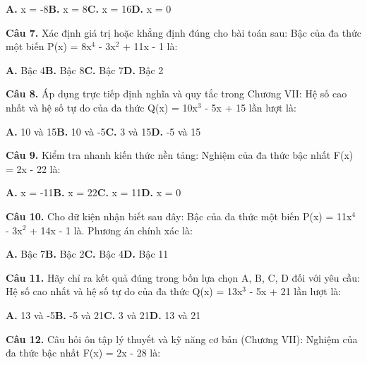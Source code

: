 \documentclass[11pt,a4paper]{article}
\begin{document}
\hspace*{1.5em}\textbf{A.} x = -8\quad\quad \textbf{B.} x = 8\quad\quad \textbf{C.} x = 16\quad\quad \textbf{D.} x = 0\par\vspace{2pt}
\textbf{\color{primary} Câu 7.} Xác định giá trị hoặc khẳng định đúng cho bài toán sau: Bậc của đa thức một biến P(x) = 8x$^4$ - 3x$^2$ + 11x - 1 là:\par
\hspace*{1.5em}\textbf{A.} Bậc 4\quad\quad \textbf{B.} Bậc 8\quad\quad \textbf{C.} Bậc 7\quad\quad \textbf{D.} Bậc 2\par\vspace{2pt}
\textbf{\color{primary} Câu 8.} Áp dụng trực tiếp định nghĩa và quy tắc trong Chương VII: Hệ số cao nhất và hệ số tự do của đa thức Q(x) = 10x$^3$ - 5x + 15 lần lượt là:\par
\hspace*{1.5em}\textbf{A.} 10 và 15\quad\quad \textbf{B.} 10 và -5\quad\quad \textbf{C.} 3 và 15\quad\quad \textbf{D.} -5 và 15\par\vspace{2pt}
\textbf{\color{primary} Câu 9.} Kiểm tra nhanh kiến thức nền tảng: Nghiệm của đa thức bậc nhất F(x) = 2x - 22 là:\par
\hspace*{1.5em}\textbf{A.} x = -11\quad\quad \textbf{B.} x = 22\quad\quad \textbf{C.} x = 11\quad\quad \textbf{D.} x = 0\par\vspace{2pt}
\textbf{\color{primary} Câu 10.} Cho dữ kiện nhận biết sau đây: Bậc của đa thức một biến P(x) = 11x$^4$ - 3x$^2$ + 14x - 1 là. Phương án chính xác là:\par
\hspace*{1.5em}\textbf{A.} Bậc 7\quad\quad \textbf{B.} Bậc 2\quad\quad \textbf{C.} Bậc 4\quad\quad \textbf{D.} Bậc 11\par\vspace{2pt}
\textbf{\color{primary} Câu 11.} Hãy chỉ ra kết quả đúng trong bốn lựa chọn A, B, C, D đối với yêu cầu: Hệ số cao nhất và hệ số tự do của đa thức Q(x) = 13x$^3$ - 5x + 21 lần lượt là:\par
\hspace*{1.5em}\textbf{A.} 13 và -5\quad\quad \textbf{B.} -5 và 21\quad\quad \textbf{C.} 3 và 21\quad\quad \textbf{D.} 13 và 21\par\vspace{2pt}
\textbf{\color{primary} Câu 12.} Câu hỏi ôn tập lý thuyết và kỹ năng cơ bản (Chương VII): Nghiệm của đa thức bậc nhất F(x) = 2x - 28 là:\par
\end{document}
